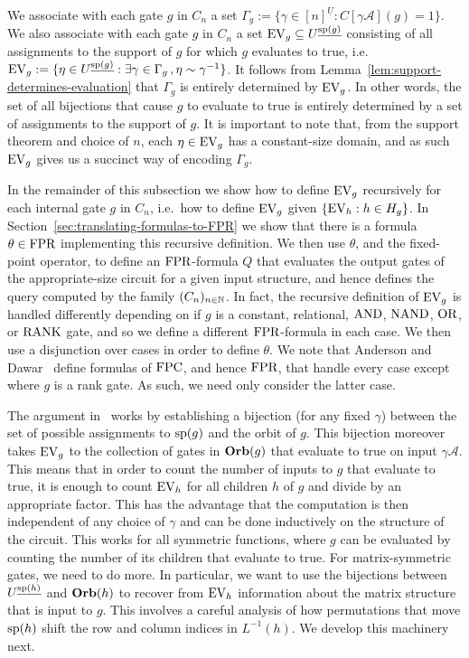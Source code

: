 \documentclass[../paper.tex]{subfiles}
\begin{document}
We associate with each gate $g$ in $C_n$ a set $\Gamma_g:= \{\gamma \in
[n]^{\underline{U}} : C[\gamma \mathcal{A}](g) = 1 \}$. We also associate with
each gate $g$ in $C_n$ a set $\text{EV}_g \subseteq U^{\underline{\text{sp}(g)}}$
consisting of all assignments to the support of $g$ for which $g$ evaluates to
true, i.e.\ $\text{EV}_g := \{ \eta \in U^{\underline{\text{sp}(g)}} : \exists \gamma \in
\Gamma_g \, ,\eta \sim \gamma^{-1}\}$. It follows from
Lemma~\ref{lem:support-determines-evaluation} that $\Gamma_g$ is entirely
determined by $\text{EV}_g$. In other words, the set of all bijections that cause $g$
to evaluate to true is entirely determined by a set of assignments to the
support of $g$. It is important to note that, from the support theorem and
choice of $n$, each $\eta \in \text{EV}_g$ has a constant-size domain, and as such
$\text{EV}_g$ gives us a succinct way of encoding $\Gamma_g$.

In the remainder of this subsection we show how to define $\text{EV}_g$ recursively
for each internal gate $g$ in $C_n$, i.e.\ how to define $\text{EV}_g$ given $\{\text{EV}_h :
h \in H_g \}$. In Section~\ref{sec:translating-formulas-to-FPR} we show that there is a formula $\theta
\in \text{\upshape FPR}$ implementing this recursive definition. We then use $\theta$, and the
fixed-point operator, to define an $\text{\upshape FPR}$-formula $Q$ that evaluates the output
gates of the appropriate-size circuit for a given input structure, and hence
defines the query computed by the family $(C_n)_{n \in \mathbb{N}}$. In fact, the
recursive definition of $\text{EV}_g$ is handled differently depending on if $g$ is a
constant, relational, $\text{\upshape AND}$, $\text{\upshape NAND}$, $\text{\upshape OR}$, or $\text{\upshape RANK}$ gate, and so we define
a different $\text{\upshape FPR}$-formula in each case. We then use a disjunction over cases in
order to define $\theta$. We note that Anderson and Dawar~\cite{AndersonD17}
define formulas of $\text{\upshape FPC}$, and hence $\text{\upshape FPR}$, that handle every
case except where $g$ is a rank gate. As such, we need only consider
the latter case.

The argument in~\cite{AndersonD17} works by establishing a bijection
(for any fixed $\gamma$) between the set of possible assignments to $\text{sp}(g)$ and the orbit
of $g$.  This bijection moreover takes $\text{EV}_g$ to the collection of
gates in $\text{\textbf{Orb}}(g)$ that evaluate to true on input
$\gamma\mathcal{A}$.  This means that in order to count the number of
inputs to $g$ that evaluate to true, it is enough to count $\text{EV}_h$ for
all children $h$ of $g$ and divide by an appropriate factor.  This has
the advantage that the computation is then independent of any choice
of $\gamma$ and can be done inductively on the structure of the
circuit.  This works for all symmetric functions, where $g$ can be
evaluated by counting the number of its children that evaluate to
true.  For matrix-symmetric gates, we need to do more.  In particular,
we want to use the bijections between $U^{\underline{\text{sp}(h)}}$ and
$\text{\textbf{Orb}}(h)$ to recover from $\text{EV}_h$ information about the matrix
structure that is input to $g$.  This involves a careful analysis of
how permutations that move $\text{sp}(h)$ shift the row and column
indices in $L^{-1}(h)$.  We develop this machinery next.
\end{document}
